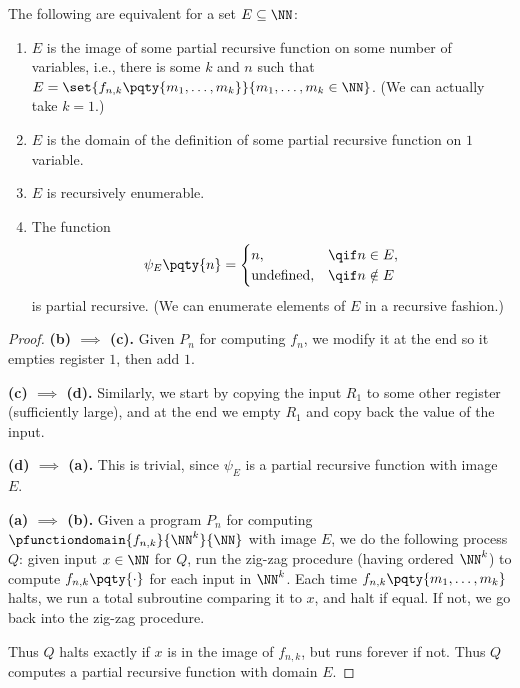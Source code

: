 \begin{theorem}
    \label{thm:characterisation-recursively-enumerable-sets}%
    The following are equivalent for a set \(E \subseteq \NN\):
    \begin{enumerate}[label=(\alph*)]
        \item \(E\) is the image of some partial recursive function on some number of variables, i.e., there is some \(k\) and \(n\) such that \(E = \set{f_{n, k} \pqty{m_1, \ldots, m_k}}{m_1, \ldots, m_k \in \NN}\). (We can actually take \(k = 1\).)
        \item \(E\) is the domain of the definition of some partial recursive function on \(1\) variable.
        \item \(E\) is recursively enumerable.
        \item The function
        \[
            \psi_E \pqty{n} = \begin{cases}
                n, & \qif n \in E, \\
                \text{undefined}, & \qif n \notin E
            \end{cases}
        \]
        is partial recursive. (We can enumerate elements of \(E\) in a recursive fashion.)
    \end{enumerate}
\end{theorem}

\begin{proof}
    \textbf{(b) \(\implies\) (c).} Given \(P_n\) for computing \(f_n\), we modify it at the end so it empties register \(1\), then add \(1\).
    
    \textbf{(c) \(\implies\) (d).} Similarly, we start by copying the input \(R_1\) to some other register (sufficiently large), and at the end we empty \(R_1\) and copy back the value of the input.

    \textbf{(d) \(\implies\) (a).} This is trivial, since \(\psi_E\) is a partial recursive function with image \(E\).

    \textbf{(a) \(\implies\) (b).} Given a program \(P_n\) for computing \(\pfunctiondomain{f_{n, k}}{\NN^k}{\NN}\) with image \(E\), we do the following process \(Q\): given input \(x \in \NN\) for \(Q\), run the zig-zag procedure (having ordered \(\NN^k\)) to compute \(f_{n, k} \pqty{\cdot}\) for each input in \(\NN^k\). Each time \(f_{n, k} \pqty{m_1, \ldots, m_k}\) halts, we run a total subroutine comparing it to \(x\), and halt if equal. If not, we go back into the zig-zag procedure.

    Thus \(Q\) halts exactly if \(x\) is in the image of \(f_{n, k}\), but runs forever if not. Thus \(Q\) computes a partial recursive function with domain \(E\).
\end{proof}

